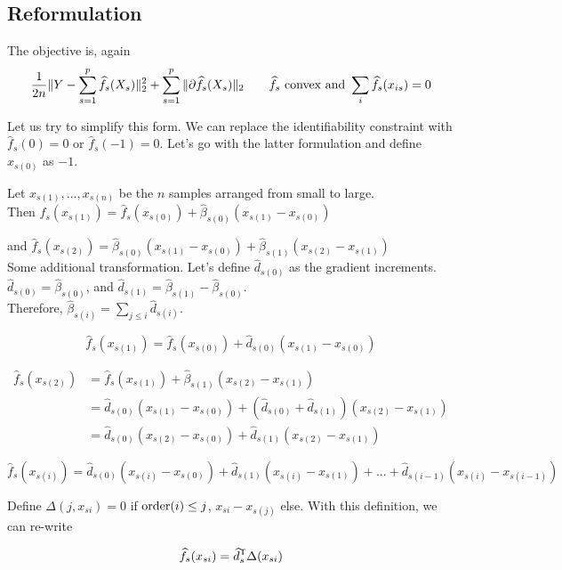 \documentclass{article}
\begin{document}
\subsection{Reformulation}

The objective is, again
\[
\frac{1}{2n} \| Y - \sum_{s=1}^p \widehat{f}_s(X_s) \|_2^2 + \sum_{s=1}^p \| \partial \widehat{f}_s(X_s)\|_2 \qquad \widehat{f}_s \textrm{ convex and } \sum_i \widehat{f}_s (x_{is}) = 0
\]

Let us try to simplify this form. We can replace the identifiability constraint with $\hat{f}_s( 0 ) = 0$ or $\hat{f}_s(-1) = 0$. Let's go with the latter formulation and define $x_{s(0)}$ as $-1$.

Let $x_{s(1)} ,..., x_{s(n)}$ be the $n$ samples arranged from small to large.\\

Then  $\hat{f}_s(x_{s(1)}) = \hat{f}_s(x_{s(0)}) + \hat{\beta}_{s(0)} (x_{s(1)}-x_{s(0)} )$

and $\hat{f}_s(x_{s(2)}) = \hat{\beta}_{s(0)} (x_{s(1)}-x_{s(0)} ) + \hat{\beta}_{s(1)} (x_{s(2)}-x_{s(1)} )$\\

Some additional transformation. Let's define $\hat{d}_{s(0)}$ as the gradient increments. $\hat{d}_{s(0)} = \hat{\beta}_{s(0)}$, and $\hat{d}_{s(1)} = \hat{\beta}_{s(1)} - \hat{\beta}_{s(0)}$.\\

Therefore, $\hat{\beta}_{s(i)} = \sum_{j \leq i} \hat{d}_{s(i)}$. 

\[
\hat{f}_s(x_{s(1)}) = \hat{f}_s(x_{s(0)}) + \hat{d}_{s(0)} ( x_{s(1)} - x_{s(0)})
\]

\begin{align*}
\hat{f}_s(x_{s(2)}) &= \hat{f}_s(x_{s(1)}) + \hat{\beta}_{s(1)} ( x_{s(2)} - x_{s(1)}) \\
 &= \hat{d}_{s(0)} ( x_{s(1)} - x_{s(0)}) + (\hat{d}_{s(0)}+\hat{d}_{s(1)}) (x_{s(2)} - x_{s(1)}) \\
 &= \hat{d}_{s(0)} (x_{s(2)}-x_{s(0)} ) + \hat{d}_{s(1)} (x_{s(2)}-x_{s(1)} )
\end{align*}

\[
\hat{f}_s(x_{s(i)}) = \hat{d}_{s(0)} ( x_{s(i)} - x_{s(0)}) + \hat{d}_{s(1)} ( x_{s(i)} - x_{s(1)}) + ... + \hat{d}_{s(i-1)} ( x_{s(i)} - x_{s(i-1)})
\]

Define $\Delta(j, x_{si}) = 0$ if $\textrm{order}(i) \leq j$, $x_{si} - x_{s(j)}$ else. With this definition, we can re-write

\[
\widehat{f}_s(x_{si}) = \widehat{d}_{s}^{\mathsf{T}} \Delta(x_{si})
\]
\end{document}
